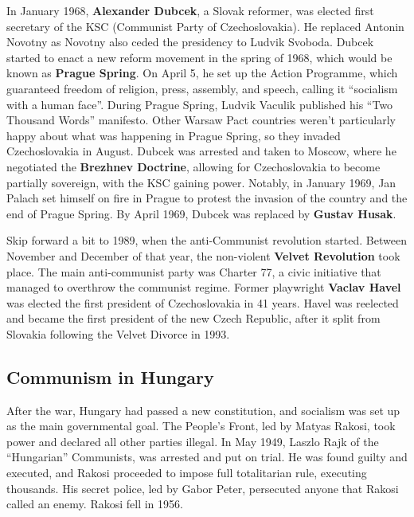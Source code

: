 In January 1968, \textbf{Alexander Dubcek}, a Slovak reformer,
was elected first secretary of the KSC (Communist Party of Czechoslovakia).
He replaced Antonin Novotny as Novotny also ceded the presidency to Ludvik Svoboda.
Dubcek started to enact a new reform movement in the spring of 1968, which would be known as \textbf{Prague Spring}.
On April 5, he set up the Action Programme, which guaranteed freedom of religion, press, assembly, and speech,
calling it ``socialism with a human face''.
During Prague Spring, Ludvik Vaculik published his ``Two Thousand Words'' manifesto.
Other Warsaw Pact countries weren't particularly happy about what was happening in Prague Spring,
so they invaded Czechoslovakia in August.
Dubcek was arrested and taken to Moscow, where he negotiated the \textbf{Brezhnev Doctrine},
allowing for Czechoslovakia to become partially sovereign, with the KSC gaining power.
Notably, in January 1969,
Jan Palach set himself on fire in Prague to protest the invasion of the country and the end of Prague Spring.
By April 1969, Dubcek was replaced by \textbf{Gustav Husak}.

Skip forward a bit to 1989, when the anti-Communist revolution started.
Between November and December of that year, the non-violent \textbf{Velvet Revolution} took place.
The main anti-communist party was Charter 77, a civic initiative that managed to overthrow the communist regime.
Former playwright \textbf{Vaclav Havel} was elected the first president of Czechoslovakia in 41 years.
Havel was reelected and became the first president of the new Czech Republic,
after it split from Slovakia following the Velvet Divorce in 1993.

\subsection*{Communism in Hungary}

After the war, Hungary had passed a new constitution, and socialism was set up as the main governmental goal.
The People's Front, led by Matyas Rakosi, took power and declared all other parties illegal.
In May 1949, Laszlo Rajk of the ``Hungarian'' Communists, was arrested and put on trial.
He was found guilty and executed, and Rakosi proceeded to impose full totalitarian rule, executing thousands.
His secret police, led by Gabor Peter, persecuted anyone that Rakosi called an enemy.
Rakosi fell in 1956.

